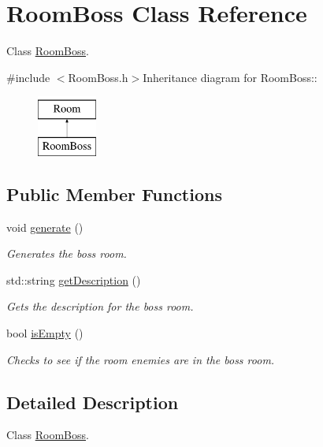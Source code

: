 \hypertarget{classRoomBoss}{
\section{RoomBoss Class Reference}
\label{classRoomBoss}
}


Class \hyperlink{classRoomBoss}{RoomBoss}.  


{\ttfamily \#include $<$RoomBoss.h$>$}Inheritance diagram for RoomBoss::\begin{figure}[H]
\begin{center}
\leavevmode
\includegraphics[height=2cm]{classRoomBoss}
\end{center}
\end{figure}
\subsection*{Public Member Functions}
\begin{DoxyCompactItemize}
\item 
void \hyperlink{classRoomBoss_a89ec3d9b6046f70dca3f802f0eed8694}{generate} ()
\begin{DoxyCompactList}\small\item\em Generates the boss room. \item\end{DoxyCompactList}\item 
std::string \hyperlink{classRoomBoss_acd5c1cfde60b2865189c40839d5625f0}{getDescription} ()
\begin{DoxyCompactList}\small\item\em Gets the description for the boss room. \item\end{DoxyCompactList}\item 
bool \hyperlink{classRoomBoss_a15ab5fc9402dad03aea7fa32c1ed3d2a}{isEmpty} ()
\begin{DoxyCompactList}\small\item\em Checks to see if the room enemies are in the boss room. \item\end{DoxyCompactList}\end{DoxyCompactItemize}


\subsection{Detailed Description}
Class \hyperlink{classRoomBoss}{RoomBoss}. 

